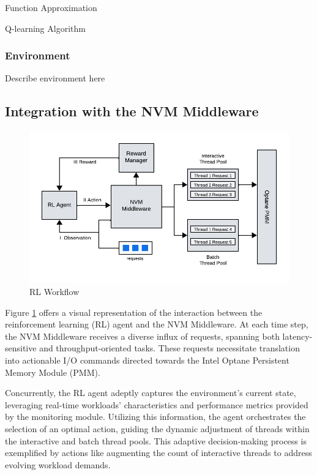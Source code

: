 Function Approximation

Q-learning Algorithm

\subsubsection{Environment}

Describe environment here


\subsection{Integration with the NVM Middleware}

\begin{figure}[ht]
  \centering
  \includegraphics[scale=1]{images/rl_workflow.png}
  \caption[RL Workflow]{RL Workflow}
  \label{fig:rl_workflow}
\end{figure}

Figure \ref{fig:rl_workflow} offers a visual representation of the interaction between the reinforcement learning (RL) agent and the NVM Middleware. At each time step, the NVM Middleware receives a diverse influx of requests, spanning both latency-sensitive and throughput-oriented tasks. These requests necessitate translation into actionable I/O commands directed towards the Intel Optane Persistent Memory Module (PMM).

Concurrently, the RL agent adeptly captures the environment's current state, leveraging real-time workloads' characteristics and performance metrics provided by the monitoring module. Utilizing this information, the agent orchestrates the selection of an optimal action, guiding the dynamic adjustment of threads within the interactive and batch thread pools. This adaptive decision-making process is exemplified by actions like augmenting the count of interactive threads to address evolving workload demands.

